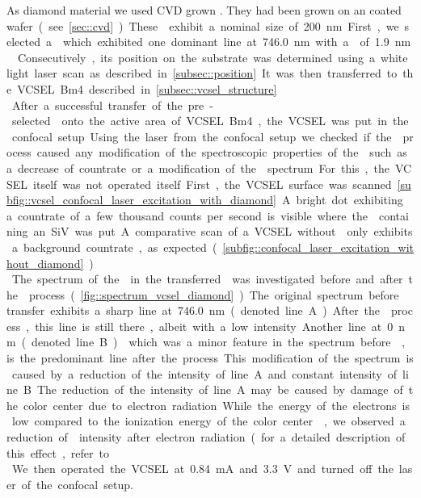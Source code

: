 	As diamond material we used CVD grown \nds.
	They had been grown on an \ir coated \si wafer (see \cref{sec::cvd}).
	These \nds exhibit a nominal size of \SI{200}{nm}.
	First, we selected a \nd which exhibited one dominant line at \SI{746.0}{nm} with a \lw of \SI{1.9}{nm}.
	Consecutively, its position on the substrate was determined using a white light laser scan as described in \cref{subsec::position}.
	It was then transferred to the VCSEL Bm4 described in \cref{subsec::vcsel_structure}.
	\\
	After a successful transfer of the pre-selected \nd onto the active area of VCSEL Bm4, the VCSEL was put in the confocal setup.
	Using the laser from the confocal setup we checked if the \pp process caused any modification of the spectroscopic properties of the \siv such as a decrease of countrate or a modification of the \fl spectrum.
	For this, the VCSEL itself was not operated itself.
	First, the VCSEL surface was scanned \cref{subfig::vcsel_confocal_laser_excitation_with_diamond}.
	.
	A bright dot exhibiting a countrate of a few thousand counts per second is visible where the \nd containing an SiV was put.
	A comparative scan of a VCSEL without \nd only exhibits a background countrate, as expected (\cref{subfig::confocal_laser_excitation_without_diamond}).
	\\
	The spectrum of the \siv in the transferred \nd was investigated before and after the \pp process (\cref{fig::spectrum_vcsel_diamond}).
	The original spectrum before \nd transfer exhibits a sharp line at \SI{746.0}{nm} (denoted line A).
	After the \pp process, this line is still there, albeit with a low intensity.
	Another line at \SI{0}{nm} (denoted line B)  which was a minor feature in the spectrum before \pp, is the predominant line after the process. 
	This modification of the spectrum is caused by a reduction of the intensity of line A and constant intensity of line B.
	The reduction of the intensity of line A may be caused by damage of the color center due to electron radiation. 
	While the energy of the electrons is low compared to the ionization energy of the color center , we observed a reduction of \fl intensity after electron radiation (for a detailed description of this effect, refer to \cite{alexmeyer::baccthesis}.
	\\
	We then operated the VCSEL at \SI{0.84}{mA} and \SI{3.3}{V} and turned off the laser of the confocal setup.
